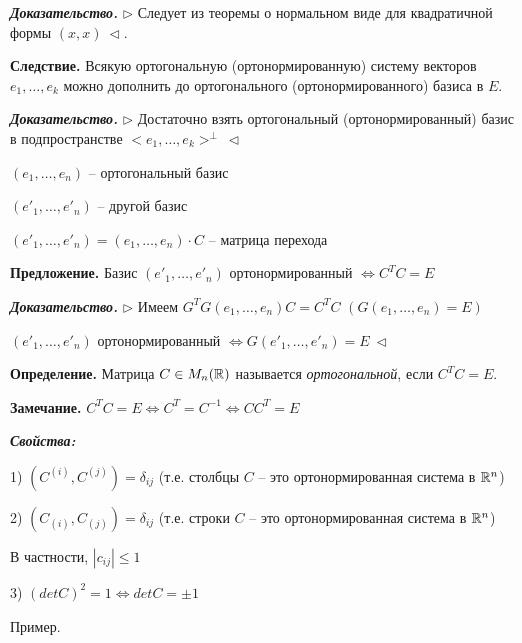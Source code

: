 \vspace{\baselineskip}
\textbf{\textit{Доказательство.}} $\rhd$ Следует из теоремы о нормальном виде для квадратичной формы $(x, x) \ \lhd$.

\vspace{\baselineskip}
\textbf{Следствие.} Всякую ортогональную (ортонормированную) систему векторов $e_1, \dots, e_k$  можно дополнить до ортогонального (ортонормированного) базиса в $E$.

\vspace{\baselineskip}
\textbf{\textit{Доказательство.}} $\rhd$ Достаточно взять ортогональный (ортонормированный) базис в подпространстве $<e_1, \dots, e_k>^{\bot} \ \lhd$

\vspace{\baselineskip}
$(e_1, \dots, e_n)$ -- ортогональный базис

$(e'_1, \dots, e'_n)$ -- другой базис

$(e'_1, \dots, e'_n) = (e_1, \dots, e_n) \cdot C$ -- матрица перехода

\vspace{\baselineskip}
\textbf{Предложение.} Базис $(e'_1, \dots, e'_n)$ ортонормированный $\Leftrightarrow C^T C = E$

\vspace{\baselineskip}
\textbf{\textit{Доказательство.}} $\rhd$ Имеем $G^T G(e_1, \dots, e_n) C = C^T C$ $(G(e_1, \dots, e_n) = E)$

$(e'_1, \dots, e'_n)$ ортонормированный $\Leftrightarrow G(e'_1, \dots, e'_n) = E \ \lhd$

\vspace{\baselineskip}
\textbf{Определение.} Матрица $C \in M_n (\mathbb{R})$ называется \textit{ортогональной}, если $C^T C = E$.

\vspace{\baselineskip}
\textbf{Замечание.} $C^T C = E \Leftrightarrow C^T = C^{-1} \Leftrightarrow C C^T = E$

\vspace{\baselineskip}
\textbf{\textit{Свойства:}}

1) $(C^{(i)}, C^{(j)}) = \delta_{ij}$ (т.е. столбцы $C$ -- это ортонормированная система в $\mathbb{R}^n$)

2) $(C_{(i)}, C_{(j)}) = \delta_{ij}$ (т.е. строки $C$ -- это ортонормированная система в $\mathbb{R}^n$)

В частности, $|c_{ij}| \leq 1$

3) $(det C)^2 = 1 \Leftrightarrow detC = \pm 1$

\vspace{\baselineskip}
Пример.

